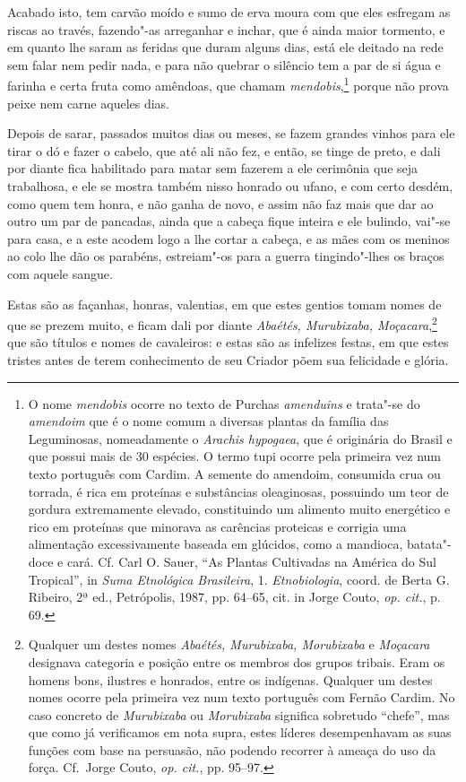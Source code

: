  Acabado isto, tem carvão moído e sumo de erva moura com que eles
esfregam as riscas ao través, fazendo"-as arreganhar e inchar, que é
ainda maior tormento, e em quanto lhe saram as feridas que duram alguns
dias, está ele deitado na rede sem falar nem pedir nada, e para não
quebrar o silêncio tem a par de si água e farinha e certa fruta como
amêndoas, que chamam \textit{mendobis},\footnote{ O nome
\textit{mendobis} ocorre no texto de Purchas \textit{amenduins} e 
trata"-se do \textit{amendoim} que é o nome comum a diversas plantas da
família das Leguminosas, nomeadamente o \textit{Arachis hypogaea}, que
é originária do Brasil e que possui mais de 30 espécies. O termo tupi
ocorre pela primeira vez num texto português com Cardim. A semente do
amendoim, consumida crua ou torrada, é rica em proteínas e substâncias
oleaginosas, possuindo um teor de gordura extremamente elevado,
constituindo um alimento muito energético e rico em proteínas que
minorava as carências proteicas e corrigia uma alimentação
excessivamente baseada em glúcidos, como a mandioca, batata"-doce e
cará. Cf. Carl O. Sauer, ``As Plantas Cultivadas na América do Sul
Tropical'', in \textit{Suma Etnológica Brasileira}, 
1. \textit{Etnobiologia}, coord. de Berta G. Ribeiro, 2ª ed., Petrópolis,
1987, pp. 64--65, cit. in Jorge Couto, \textit{op. cit.}, p. 69.} 
porque não prova peixe nem carne aqueles dias.

 Depois de sarar, passados muitos dias ou meses, se fazem grandes vinhos
para ele tirar o dó e fazer o cabelo, que até ali não fez, e então, se
tinge de preto, e dali por diante fica habilitado para matar sem
fazerem a ele cerimônia que seja trabalhosa, e ele se mostra também
nisso honrado ou ufano, e com certo desdém, como quem tem honra, e não
ganha de novo, e assim não faz mais que dar ao outro um par de
pancadas, ainda que a cabeça fique inteira e ele bulindo, vai"-se para
casa, e a este acodem logo a lhe cortar a cabeça, e as mães com os
meninos ao colo lhe dão os parabéns, estreiam"-os para a guerra
tingindo"-lhes os braços com aquele sangue.

 Estas são as façanhas, honras, valentias, em que estes gentios tomam
nomes de que se prezem muito, e ficam dali por diante \textit{Abaétés,
Murubixaba, Moçacara},\footnote{ Qualquer um destes nomes
\textit{Abaétés, Murubixaba, Morubixaba} e \textit{Moçacara}
designava categoria e posição entre os membros dos grupos tribais.
Eram os homens bons, ilustres e honrados, entre os indígenas. Qualquer
um destes nomes ocorre pela primeira vez num texto português com Fernão
Cardim. No caso concreto de \textit{Murubixaba} ou \textit{Morubixaba}
significa sobretudo ``chefe'', mas que como já verificamos em nota
supra, estes líderes desempenhavam as suas funções com base na
persuasão, não podendo recorrer à ameaça do uso da força. Cf.~Jorge
Couto, \textit{op. cit.}, pp. 95--97.} que são títulos e nomes
de cavaleiros: e estas são as infelizes festas, em que estes tristes
antes de terem conhecimento de seu Criador põem sua felicidade e glória.

